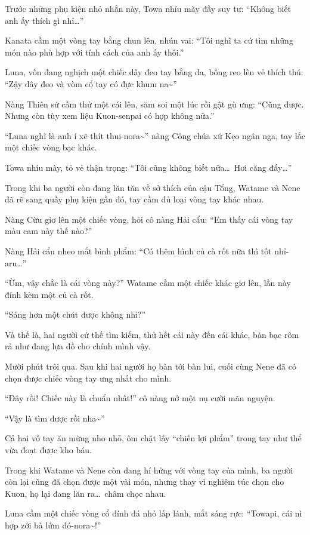 \documentclass[../main.tex]{subfiles}
\begin{document}
Trước những phụ kiện nhỏ nhắn này, Towa nhíu mày đầy suy tư: ``Không biết anh ấy thích gì nhỉ\dots''

Kanata cầm một vòng tay bằng chun lên, nhún vai: ``Tôi nghĩ ta cứ tìm những món nào phù hợp với tính cách của anh ấy thôi.''

Luna, vốn đang nghịch một chiếc dây đeo tay bằng da, bỗng reo lên vẻ thích thú: ``Zậy dây đeo và vòm cổ tay có đực khum na\~{}''

Nàng Thiên sứ cầm thử một cái lên, săm soi một lúc rồi gật gù ưng: ``Cũng được. Nhưng còn tùy xem liệu Kuon-senpai có hợp không nữa.''

``Luna nghĩ là anh í xẽ thít thui-nora\~{}'' nàng Công chúa xứ Kẹo ngân nga, tay lắc một chiếc vòng bạc khác.

Towa nhíu mày, tỏ vẻ thận trọng: ``Tôi cũng không biết nữa\dots\ Hơi căng đấy\dots''

Trong khi ba người còn đang lăn tăn về sở thích của cậu Tổng, Watame và Nene đã rẽ sang quầy phụ kiện gần đó, tay cầm đủ loại vòng tay khác nhau.

Nàng Cừu giơ lên một chiếc vòng, hỏi cô nàng Hải cẩu: ``Em thấy cái vòng tay màu cam này thế nào?''

Nàng Hải cẩu nheo mắt bình phẩm: ``Có thêm hình củ cà rốt nữa thì tốt nhỉ-aru\dots''

``Ừm, vậy chắc là cái vòng này?'' Watame cầm một chiếc khác giơ lên, lần này đính kèm một củ cà rốt.

``Sáng hơn một chút được không nhỉ?''

Và thế là, hai người cứ thế tìm kiếm, thử hết cái này đến cái khác, bàn bạc rôm rả như đang lựa đồ cho chính mình vậy.

Mười phút trôi qua. Sau khi hai người họ bàn tới bàn lui, cuối cùng Nene đã có chọn được chiếc vòng tay ưng nhất cho mình.

``Đây rồi! Chiếc này là chuẩn nhất!'' cô nàng nở một nụ cười mãn nguyện.

``Vậy là tìm được rồi nha\~{}''

Cả hai vỗ tay ăn mừng nho nhỏ, ôm chặt lấy ``chiến lợi phẩm'' trong tay như thể vừa đoạt được kho báu.

\ct

Trong khi Watame và Nene còn đang hí hửng với vòng tay của mình, ba người còn lại cũng đã chọn được một vài món, nhưng thay vì nghiêm túc chọn cho Kuon, họ lại đang lăn ra\dots\ châm chọc nhau.

Luna cầm một chiếc vòng cổ đính đá nhỏ lấp lánh, mắt sáng rực: ``Towapi, cái nì hợp zới bà lứm đó-nora\~{}!''
\end{document}
